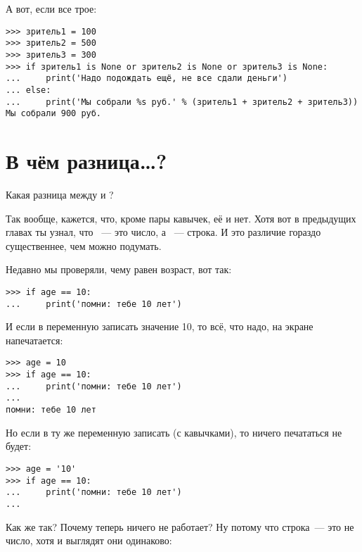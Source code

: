 А вот, если все трое:

\begin{listing}
\begin{verbatim}
>>> зритель1 = 100
>>> зритель2 = 500
>>> зритель3 = 300
>>> if зритель1 is None or зритель2 is None or зритель3 is None:
...     print('Надо подождать ещё, не все сдали деньги')
... else:
...     print('Мы собрали %s руб.' % (зритель1 + зритель2 + зритель3))
Мы собрали 900 руб.
\end{verbatim}
\end{listing}

\section{В чём разница…?}\label{whatsthedifference}

Какая разница между  и ?

Так вообще, кажется, что, кроме пары кавычек, её и нет. Хотя вот в предыдущих главах ты узнал, что  — это число, а  — строка. И это различие гораздо существеннее, чем можно подумать.

Недавно мы проверяли, чему равен возраст, вот так:

\begin{listing}
\begin{verbatim}
>>> if age == 10:
...     print('помни: тебе 10 лет')
\end{verbatim}
\end{listing}

И если в переменную  записать значение 10, то всё, что надо, на экране напечатается:

\begin{listing}
\begin{verbatim}
>>> age = 10
>>> if age == 10:
...     print('помни: тебе 10 лет')
...
помни: тебе 10 лет
\end{verbatim}
\end{listing}

Но если в ту же переменную записать  (с кавычками), то ничего печататься не будет:

\begin{listing}
\begin{verbatim}
>>> age = '10'
>>> if age == 10:
...     print('помни: тебе 10 лет')
...
\end{verbatim}
\end{listing}

Как же так? Почему теперь ничего не работает? Ну потому что строка — это не число, хотя и выглядят они одинаково:

